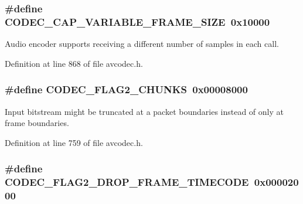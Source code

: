 \subsubsection[{\texorpdfstring{C\+O\+D\+E\+C\+\_\+\+C\+A\+P\+\_\+\+V\+A\+R\+I\+A\+B\+L\+E\+\_\+\+F\+R\+A\+M\+E\+\_\+\+S\+I\+ZE}{CODEC_CAP_VARIABLE_FRAME_SIZE}}]{\setlength{\rightskip}{0pt plus 5cm}\#define C\+O\+D\+E\+C\+\_\+\+C\+A\+P\+\_\+\+V\+A\+R\+I\+A\+B\+L\+E\+\_\+\+F\+R\+A\+M\+E\+\_\+\+S\+I\+ZE~0x10000}\hypertarget{group__lavc__core_gaa2e644f74c8013e29ec51d6accc7ac1b}{}\label{group__lavc__core_gaa2e644f74c8013e29ec51d6accc7ac1b}
Audio encoder supports receiving a different number of samples in each call. 

Definition at line 868 of file avcodec.\+h.

\subsubsection[{\texorpdfstring{C\+O\+D\+E\+C\+\_\+\+F\+L\+A\+G2\+\_\+\+C\+H\+U\+N\+KS}{CODEC_FLAG2_CHUNKS}}]{\setlength{\rightskip}{0pt plus 5cm}\#define C\+O\+D\+E\+C\+\_\+\+F\+L\+A\+G2\+\_\+\+C\+H\+U\+N\+KS~0x00008000}\hypertarget{group__lavc__core_ga24f124c07fbfbec412c0692673010e27}{}\label{group__lavc__core_ga24f124c07fbfbec412c0692673010e27}


Input bitstream might be truncated at a packet boundaries instead of only at frame boundaries. 



Definition at line 759 of file avcodec.\+h.

\subsubsection[{\texorpdfstring{C\+O\+D\+E\+C\+\_\+\+F\+L\+A\+G2\+\_\+\+D\+R\+O\+P\+\_\+\+F\+R\+A\+M\+E\+\_\+\+T\+I\+M\+E\+C\+O\+DE}{CODEC_FLAG2_DROP_FRAME_TIMECODE}}]{\setlength{\rightskip}{0pt plus 5cm}\#define C\+O\+D\+E\+C\+\_\+\+F\+L\+A\+G2\+\_\+\+D\+R\+O\+P\+\_\+\+F\+R\+A\+M\+E\+\_\+\+T\+I\+M\+E\+C\+O\+DE~0x00002000}\hypertarget{group__lavc__core_gae6fa288f0e5bfbda7246dfd398edb4e3}{}\label{group__lavc__core_gae6fa288f0e5bfbda7246dfd398edb4e3}


